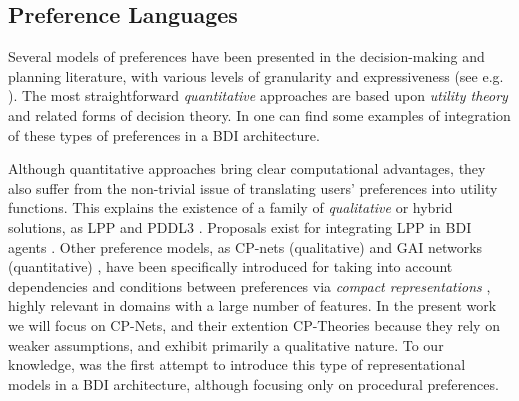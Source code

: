 \documentclass[sigconf,anonymous]{aamas}
\begin{document}

\subsection{Preference Languages}
Several models of preferences have been presented in the decision-making and planning literature, with various levels of granularity and expressiveness (see e.g. \cite{Domshlak2011}). The most straightforward \textit{quantitative} approaches are based upon \textit{utility theory} and related forms of decision theory. In \cite{Cranefield2017} one can find some examples of integration of these types of preferences in a BDI architecture. %

Although quantitative approaches bring clear computational advantages, they also suffer from the non-trivial issue of translating users' preferences into utility functions. This explains the existence of a family of \textit{qualitative} or hybrid solutions, as LPP \cite{Bienvenu2006} and PDDL3 \cite{Gerevini2005}. Proposals exist for integrating LPP in BDI agents \cite{Visser2011}. Other preference models, as CP-nets (qualitative) \cite{Boutilier2004} and GAI networks (quantitative) \cite{Gonzales2004}, have been specifically introduced for taking into account dependencies and conditions between preferences via \textit{compact representations} \cite{Pigozzi2016}, highly relevant in domains with a large number of features. %
In the present work we will focus on CP-Nets, and their extention CP-Theories because they rely on weaker assumptions, and exhibit primarily a qualitative nature. To our knowledge, \cite{Mohajeri2019} was the first attempt to introduce this type of representational models in a BDI architecture, although focusing only on procedural preferences.
\end{document}
